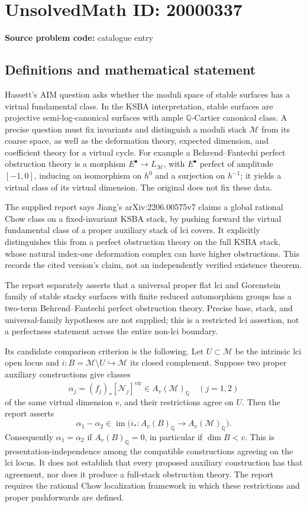 \documentclass[11pt]{article}
\newcommand{\Q}{\mathbb{Q}}
\begin{document}
\section*{UnsolvedMath ID: 20000337}
\textbf{Source problem code:} catalogue entry
\subsection{Definitions and mathematical statement}
Hassett's AIM question asks whether the moduli space of stable surfaces has a virtual fundamental class. In the KSBA interpretation, stable surfaces are projective semi-log-canonical surfaces with ample \(\Q\)-Cartier canonical class. A precise question must fix invariants and distinguish a moduli stack \(\mathcal M\) from its coarse space, as well as the deformation theory, expected dimension, and coefficient theory for a virtual cycle. For example a Behrend--Fantechi perfect obstruction theory is a morphism \(E^\bullet\to L_{\mathcal M}\), with \(E^\bullet\) perfect of amplitude \([-1,0]\), inducing an isomorphism on \(h^0\) and a surjection on \(h^{-1}\); it yields a virtual class of its virtual dimension. The original does not fix these data.

The supplied report says Jiang's arXiv:2206.00575v7 claims a global rational Chow class on a fixed-invariant KSBA stack, by pushing forward the virtual fundamental class of a proper auxiliary stack of lci covers. It explicitly distinguishes this from a perfect obstruction theory on the full KSBA stack, whose natural index-one deformation complex can have higher obstructions. This records the cited version's claim, not an independently verified existence theorem.

The report separately asserts that a universal proper flat lci and Gorenstein family of stable stacky surfaces with finite reduced automorphism groups has a two-term Behrend--Fantechi perfect obstruction theory. Precise base, stack, and universal-family hypotheses are not supplied; this is a restricted lci assertion, not a perfectness statement across the entire non-lci boundary.

Its candidate comparison criterion is the following. Let \(U\subset\mathcal M\) be the intrinsic lci open locus and \(i:B=\mathcal M\setminus U\hookrightarrow\mathcal M\) its closed complement. Suppose two proper auxiliary constructions give classes
\[
\alpha_j=(f_j)_*[\mathcal N_j]^{\mathrm{vir}}\in A_v(\mathcal M)_{\Q}
\quad(j=1,2)
\]
of the same virtual dimension \(v\), and their restrictions agree on \(U\). Then the report asserts
\[
\alpha_1-\alpha_2\in
\operatorname{im}\bigl(i_*:A_v(B)_{\Q}\to A_v(\mathcal M)_{\Q}\bigr).
\]
Consequently \(\alpha_1=\alpha_2\) if \(A_v(B)_{\Q}=0\), in particular if \(\dim B<v\). This is presentation-independence among the compatible constructions agreeing on the lci locus. It does not establish that every proposed auxiliary construction has that agreement, nor does it produce a full-stack obstruction theory. The report requires the rational Chow localization framework in which these restrictions and proper pushforwards are defined.
\end{document}
